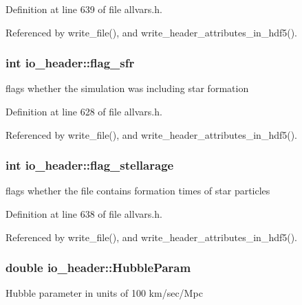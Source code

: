 Definition at line 639 of file allvars.h.



Referenced by write\_\-file(), and write\_\-header\_\-attributes\_\-in\_\-hdf5().

\hypertarget{structio__header_afe21a629578012fd99d118d2ad834763}{
\subsubsection[{flag\_\-sfr}]{\setlength{\rightskip}{0pt plus 5cm}int {\bf io\_\-header::flag\_\-sfr}}}
\label{structio__header_afe21a629578012fd99d118d2ad834763}
flags whether the simulation was including star formation 

Definition at line 628 of file allvars.h.



Referenced by write\_\-file(), and write\_\-header\_\-attributes\_\-in\_\-hdf5().

\hypertarget{structio__header_abe83e840bb4778a3be11a084dfa85c3c}{
\subsubsection[{flag\_\-stellarage}]{\setlength{\rightskip}{0pt plus 5cm}int {\bf io\_\-header::flag\_\-stellarage}}}
\label{structio__header_abe83e840bb4778a3be11a084dfa85c3c}
flags whether the file contains formation times of star particles 

Definition at line 638 of file allvars.h.



Referenced by write\_\-file(), and write\_\-header\_\-attributes\_\-in\_\-hdf5().

\hypertarget{structio__header_ad0f0d02804350f8935aadca9b5ef0fcf}{
\subsubsection[{HubbleParam}]{\setlength{\rightskip}{0pt plus 5cm}double {\bf io\_\-header::HubbleParam}}}
\label{structio__header_ad0f0d02804350f8935aadca9b5ef0fcf}
Hubble parameter in units of 100 km/sec/Mpc 

